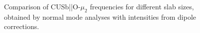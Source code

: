 \documentclass[11pt,DIV=13,BCOR=5mm,a4paper,headinclude]{scrbook}
\begin{document}
\begin{figure}[!h]
    \centering
             \quad
             \quad
             \caption{Comparison of CUSb||O-$\mu_2$ frequencies for different slab sizes, obtained by normal mode analyses with intensities from dipole corrections.}
            \label{abb:Cb2_size_comp}
\end{figure}
\end{document}
